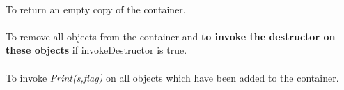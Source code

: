 \\
To return an empty copy of the container. \\

\\
To remove all objects from the container and {\bf to invoke the
destructor on these objects} if \p invokeDestructor is \p true. \\

\\
To invoke {\em Print(s,flag)} on all objects which have been added to
the container. 





